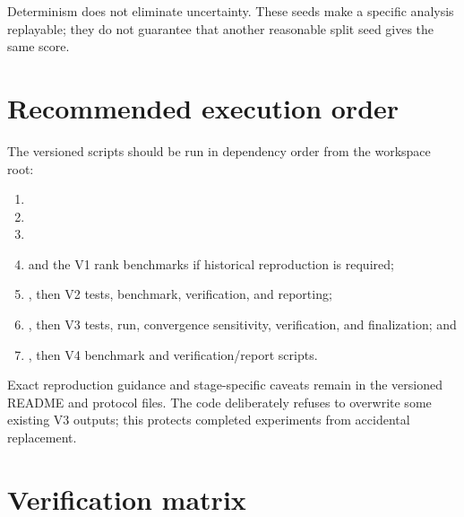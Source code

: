 Determinism does not eliminate uncertainty. These seeds make a specific analysis
replayable; they do not guarantee that another reasonable split seed gives the
same score.

\section{Recommended execution order}

The versioned scripts should be run in dependency order from the workspace root:

\begin{enumerate}
  \item {}
  \item {}
  \item {}
  \item {} and the V1
  rank benchmarks if historical reproduction is required;
  \item {}, then V2 tests,
  benchmark, verification, and reporting;
  \item {}, then V3
  tests, run, convergence sensitivity, verification, and finalization; and
  \item {}, then V4
  benchmark and verification/report scripts.
\end{enumerate}

Exact reproduction guidance and stage-specific caveats remain in the versioned
README and protocol files. The code deliberately refuses to overwrite some
existing V3 outputs; this protects completed experiments from accidental
replacement.

\section{Verification matrix}

